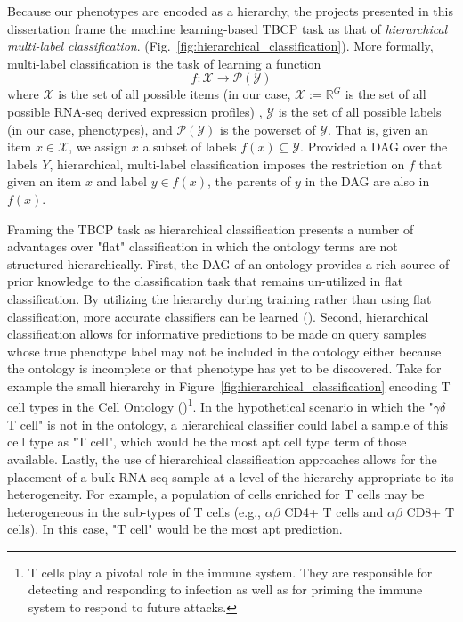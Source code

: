 Because our phenotypes are encoded as a hierarchy, the projects presented in this dissertation frame the machine learning-based TBCP task as that of \textit{hierarchical multi-label classification}.  (Fig.~\ref{fig:hierarchical_classification}).  More formally, multi-label classification is the task of learning a function 
$$f: \mathcal{X} \rightarrow \mathcal{P}(\mathcal{Y})$$ 
where $\mathcal{X}$ is the set of all possible items (in our case, $\mathcal{X} := \mathbb{R}^G$ is the set of all possible RNA-seq derived expression profiles) , $\mathcal{Y}$ is the set of all possible labels (in our case, phenotypes), and $\mathcal{P}(\mathcal{Y})$ is the powerset of $\mathcal{Y}$.  That is, given an item $x \in \mathcal{X}$, we assign $x$ a subset of labels $f(x) \subseteq\mathcal{Y}$.  Provided a DAG over the labels $Y$, hierarchical, multi-label classification imposes the restriction on $f$ that given an item $x$ and label $y \in f(x)$, the parents of $y$ in the DAG are also in $f(x)$.

Framing the TBCP task as hierarchical classification presents a number of advantages over "flat" classification in which the ontology terms are not structured hierarchically. First, the DAG of an ontology provides a rich source of prior knowledge to the classification task that remains un-utilized in flat classification.  By utilizing the hierarchy during training rather than using flat classification, more accurate classifiers can be learned (\citealp{BarutcuogluSchapireTroyanskaya2006}). Second, hierarchical classification allows for informative predictions to be made on query samples whose true phenotype label may not be included in the ontology either because the ontology is incomplete or that phenotype has yet to be discovered. Take for example the small hierarchy in Figure~\ref{fig:hierarchical_classification} encoding T cell types in the Cell Ontology (\citealp{Bard})\footnote{T cells play a pivotal role in the immune system.  They are responsible for detecting and responding to infection as well as for priming the immune system to respond to future attacks.}.  In the hypothetical scenario in which the "$\gamma\delta$ T cell"  is not in the ontology, a hierarchical classifier could label a sample of this cell type as "T cell", which would be the most apt cell type term of those available. Lastly, the use of hierarchical classification approaches allows for the placement of a bulk RNA-seq sample at a level of the hierarchy appropriate to its heterogeneity. For example, a population of cells enriched for T cells may be heterogeneous in the sub-types of T cells (e.g., $\alpha\beta$ CD4+ T cells and $\alpha\beta$ CD8+ T cells). In this case, "T cell" would be the most apt prediction.

